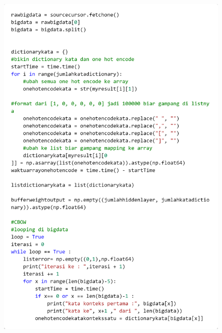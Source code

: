 \documentclass[12pt]{report}
\begin{document}
\begin{figure}[H]
\centering
\includegraphics[scale=0.3]{trainingcbow4kata2}
\end{figure}
\end{document}
